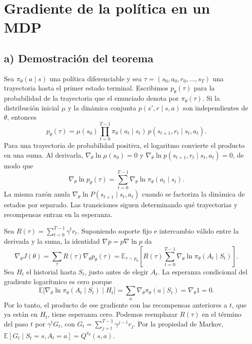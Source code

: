 \section{Gradiente de la política en un MDP}

\subsection*{a) Demostración del teorema}

Sea $\pi_\theta(a\mid s)$ una política diferenciable y sea $\tau=(s_0,a_0,r_0,\ldots,s_T)$ una trayectoria hasta el primer estado terminal. Escribimos $p_\theta(\tau)$ para la probabilidad de la trayectoria que el enunciado denota por $\pi_\theta(\tau)$. Si la distribución inicial $\mu$ y la dinámica conjunta $p(s',r\mid s,a)$ son independientes de $\theta$, entonces
\[
    p_\theta(\tau)=\mu(s_0)\prod_{t=0}^{T-1}
        \pi_\theta(a_t\mid s_t)\,p(s_{t+1},r_t\mid s_t,a_t).
\]
Para una trayectoria de probabilidad positiva, el logaritmo convierte el producto en una suma. Al derivarla, $\nabla_\theta\ln\mu(s_0)=0$ y $\nabla_\theta\ln p(s_{t+1},r_t\mid s_t,a_t)=0$, de modo que
\[
    \nabla_\theta\ln p_\theta(\tau)
     =\sum_{t=0}^{T-1}\nabla_\theta\ln\pi_\theta(a_t\mid s_t).
\]
La misma razón anula $\nabla_\theta\ln P(s_{t+1}\mid s_t,a_t)$ cuando se factoriza la dinámica de estados por separado. Las transiciones siguen determinando qué trayectorias y recompensas entran en la esperanza.

Sea $R(\tau)=\sum_{t=0}^{T-1}\gamma^t r_t$. Suponiendo soporte fijo e intercambio válido entre la derivada y la suma, la identidad $\nabla p=p\nabla\ln p$ da
\begin{equation}
    \nabla_\theta J(\theta)
     =\sum_\tau R(\tau)\nabla_\theta p_\theta(\tau)
     =\mathbb{E}_{\tau\sim p_\theta}\left[
        R(\tau)\sum_{t=0}^{T-1}\nabla_\theta\ln\pi_\theta(A_t\mid S_t)
       \right].
\end{equation}
Sea $H_t$ el historial hasta $S_t$, justo antes de elegir $A_t$. La esperanza condicional del gradiente logarítmico es cero porque
\[
    \mathbb{E}\big[\nabla_\theta\ln\pi_\theta(A_t\mid S_t)\mid H_t\big]
      =\sum_a\nabla_\theta\pi_\theta(a\mid S_t)
      =\nabla_\theta 1=0.
\]
Por lo tanto, el producto de ese gradiente con las recompensas anteriores a $t$, que ya están en $H_t$, tiene esperanza cero. Podemos reemplazar $R(\tau)$ en el término del paso $t$ por $\gamma^t G_t$, con $G_t=\sum_{j=t}^{T-1}\gamma^{j-t}r_j$. Por la propiedad de Markov, $\mathbb{E}[G_t\mid S_t=s,A_t=a]=Q^{\pi_\theta}(s,a)$.

